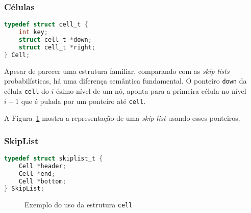 \documentclass[paper=a4, fontsize=11pt]{scrartcl} %
\newcommand{\snode}[2]{\node(#1)[item]{\ensuremath{#2}}}
\numberwithin{equation}{section}
\numberwithin{figure}{section}
\numberwithin{table}{section}
\numberwithin{definition}{section}
\numberwithin{theorem}{section}
\numberwithin{property}{section}
\numberwithin{proposition}{section}
\newcommand{\sls}{\textit{skip lists}\xspace}
\renewcommand{\sl}{\textit{skip list}\xspace}
\begin{document}
\subsubsection{Células}

\begin{lstlisting}[caption=Estrutura das Células, language=C]
typedef struct cell_t {
    int key;
    struct cell_t *down;
    struct cell_t *right;
} Cell;
\end{lstlisting}

Apesar de parecer uma estrutura familiar, comparando com as \sls probabilísticas, há uma diferença
semântica fundamental. O ponteiro \verb|down| da célula \verb|cell| do $i$-ésimo nível de um nó,
aponta para a primeira célula no nível $i - 1$ que é pulada por um ponteiro até \verb|cell|.

A Figura~\ref{fig:cell_structure} mostra a representação de uma \sl usando esses ponteiros.

\subsubsection{SkipList}
\begin{lstlisting}[caption=Estrutura das Skip Lists determinísticas, language=C]
typedef struct skiplist_t {
    Cell *header;
    Cell *end;
    Cell *bottom;
} SkipList;
\end{lstlisting}


\begin{figure}
  \centering
  \caption{Exemplo do uso da estrutura \texttt{cell}}
  \label{fig:cell_structure}
\end{figure}
\end{document}
